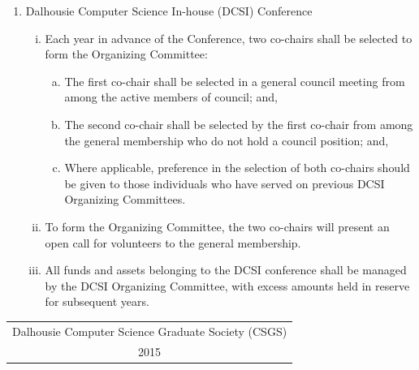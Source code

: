\documentclass[]{report}
\begin{document}
{\begin{enumerate}
		\item Dalhousie Computer Science In-house (DCSI) Conference
			\begin{enumerate}[i.]
				\item Each year in advance of the Conference, two co-chairs shall be selected to form the Organizing Committee:
				\begin{enumerate}[a.]
					\item The first co-chair shall be selected in a general council meeting from among the active members of council; and,
					\item The second co-chair shall be selected by the first co-chair from among the general membership who do not hold a council position; and,
					\item Where applicable, preference in the selection of both co-chairs should be given to those individuals who have served on previous DCSI Organizing Committees.
				\end{enumerate}
				\item To form the Organizing Committee, the two co-chairs will present an open call for volunteers to the general membership.
				\item All funds and assets belonging to the DCSI conference shall be managed by the DCSI Organizing Committee, with excess amounts held in reserve for subsequent years.
			\end{enumerate}
	
	\end{enumerate}
}

%
%	
%	

\clearpage
\centering
\begin{titlepage}

	\begin{table}[t]
	\renewcommand{\arraystretch}{1.3}
	\centering
	\begin{tabular}{c}
		Dalhousie Computer Science Graduate Society (CSGS)\\2015
	\end{tabular}
	\end{table}

\end{titlepage}
\end{document}
